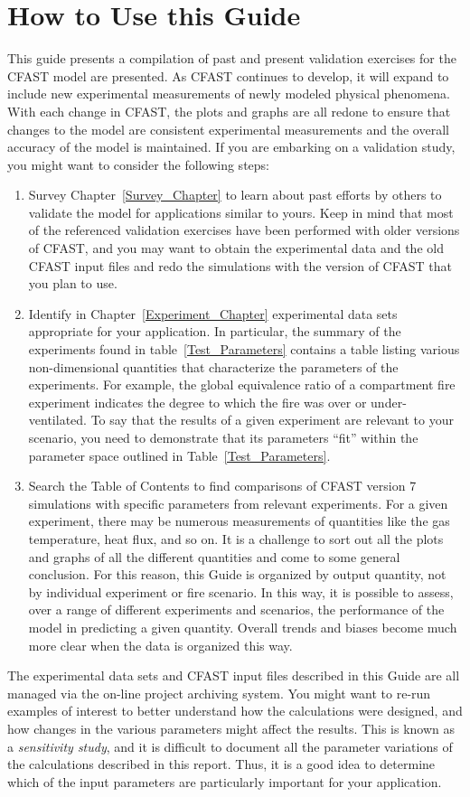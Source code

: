 \section{How to Use this Guide}

This guide presents a compilation of past and present validation exercises for the CFAST model are presented.  As CFAST continues to develop, it will expand to include new experimental measurements of newly modeled physical phenomena. With each change in CFAST, the plots and graphs are all redone to ensure that changes to the model are consistent experimental measurements and the overall accuracy of the model is maintained. If you are embarking on a validation study, you might want to consider the following steps:
\begin{enumerate}
\item Survey Chapter~\ref{Survey_Chapter} to learn about past efforts by others to validate the model for applications similar to yours. Keep in mind that most of the referenced validation exercises have been performed with older versions of CFAST, and you may want to obtain the experimental data and the old CFAST input files and redo the simulations with the version of CFAST that you plan to use.
\item Identify in Chapter~\ref{Experiment_Chapter} experimental data sets appropriate for your application. In particular, the summary of the experiments found in table~\ref{Test_Parameters} contains a table listing various non-dimensional quantities that characterize the parameters of the experiments. For example, the global equivalence ratio of a compartment fire experiment indicates the degree to which the fire was over or under-ventilated. To say that the results of a given experiment are relevant to your scenario, you need to demonstrate that its parameters ``fit'' within the parameter space outlined in Table~\ref{Test_Parameters}.
\item Search the Table of Contents to find comparisons of CFAST version 7 simulations with specific parameters from relevant experiments. For a given experiment, there may be numerous measurements of quantities like the gas temperature, heat flux, and so on. It is a challenge to sort out all the plots and graphs of all the different quantities and come to some general conclusion. For this reason, this Guide is organized by output quantity, not by individual experiment or fire scenario. In this way, it is possible to assess, over a range of different experiments and scenarios, the performance of the model in predicting a given quantity. Overall trends and biases become much more clear when the data is organized this way.
\end{enumerate}
The experimental data sets and CFAST input files described in this Guide are all managed via the on-line project archiving system. You might want to re-run examples of interest to better understand how the calculations were designed, and how changes in the various parameters might affect the results. This is known as a {\em sensitivity study}, and it is difficult to document all the parameter variations of the calculations described in this report. Thus, it is a good idea to determine which of the input parameters are particularly important for your application.

